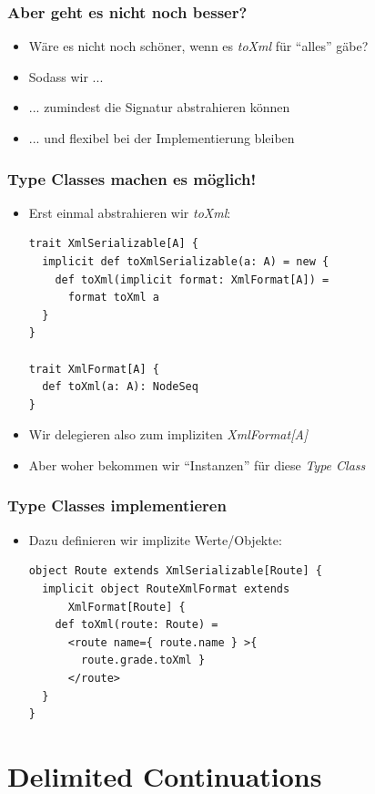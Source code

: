 \documentclass{beamer}
\begin{document}
\begin{frame}[fragile]
  \frametitle{Aber geht es nicht noch besser?}
  \begin{itemize}
    \item W\"are es nicht noch sch\"oner, wenn es \emph{toXml} f\"ur "`alles"' g\"abe?
    \item Sodass wir ... 
    \item ... zumindest die Signatur abstrahieren k\"onnen
    \item ... und flexibel bei der Implementierung bleiben
  \end{itemize}
\end{frame}

\begin{frame}[fragile]
  \frametitle{Type Classes machen es m\"oglich!}
  \begin{itemize}
    \item Erst einmal abstrahieren wir \emph{toXml}:
    \begin{lstlisting}
trait XmlSerializable[A] {
  implicit def toXmlSerializable(a: A) = new {
    def toXml(implicit format: XmlFormat[A]) =
      format toXml a
  }
}

trait XmlFormat[A] {
  def toXml(a: A): NodeSeq
}
    \end{lstlisting}
    \item Wir delegieren also zum impliziten \emph{XmlFormat[A]}
    \item Aber woher bekommen wir "`Instanzen"' f\"ur diese \emph{Type Class}
  \end{itemize}
\end{frame}

\begin{frame}[fragile]
  \frametitle{Type Classes implementieren}
  \begin{itemize}
    \item Dazu definieren wir implizite Werte/Objekte:
    \begin{lstlisting}
object Route extends XmlSerializable[Route] {
  implicit object RouteXmlFormat extends
      XmlFormat[Route] {
    def toXml(route: Route) =
      <route name={ route.name } >{
        route.grade.toXml }
      </route>
  }
}
    \end{lstlisting}
  \end{itemize}
\end{frame}


\section{Delimited Continuations}
\end{document}
